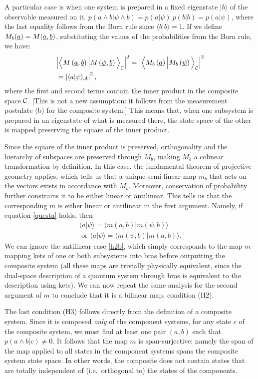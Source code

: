 \documentclass[aps,prl,amsmath,amssymb,twocolumn,nofootinbib]{revtex4}
\theoremstyle{plain}
\theoremstyle{definition}
\theoremstyle{remark}
\newcommand{\pj}[1] {\underbar{$#1$}}
\def\>{\rangle}
\def\<{\langle}
\def\labell#1{\label{#1}}
\begin{document}
A particular case is when one system is
prepared in a fixed eigenstate $|b\>$ of the observable measured on it,
$p(a\wedge b|\psi\wedge b)=p(a|\psi)\:p(b|b)=p(a|\psi)$, where the last equality follows from the Born rule since $\<b|b\>=1$. 
  If we define $M_b(\pj{a}) = M(\pj{a},\pj{b})$, substituting the values of the
probabilities from the Born rule, we have:
\begin{align} &\Big|\Big\<M\left(\pj{a},\pj{b}\right)\Big|M\left(\pj{\psi},\pj{b}\right)\Big\>_{\cal C}\Big|^2
  =\Big|\Big\<M_b\left(\pj{a}\right)\Big|M_b\left(\pj{\psi}\right)\Big\>_{\cal C}\Big|^2
\nonumber \\&
=\left|\<a|\psi\>_{\cal A}\right|^2
\labell{questa},
\end{align}
where the first and second terms contain the inner product in the composite
space $\cal C$. [This is not a new assumption: it follows from the
measurement postulate (b) for the composite system.] This means that,
when one subsystem is prepared in an eigenstate of what is measured
there, the state space of the other is mapped preserving the square of
the inner product.

Since the square of the inner product is preserved, orthogonality and
the hierarchy of subspaces are preserved through $M_b$, making $M_b$ a
colinear transformation by definition. In this case, the fundamental
theorem of projective geometry \cite{fun} applies, which tells us that
a unique semi-linear map $m_b$ that acts on the vectors exists in accordance with $M_b$.
Moreover, conservation of probability further constrains it to be
either linear or antilinear. This tells us that the corresponding $m$
is either linear or antilinear in the first argument. Namely, if equation
\eqref{questa} holds, then
\begin{align}
\<a|\psi\>=\<m(a,b)|m(\psi,b)\>\labell{h2}\;
 \\\mbox{ or }
\<a|\psi\>=\<m(\psi,b)|m(a,b)\> \labell{h2b}.
\end{align}
We can ignore the antilinear case \eqref{h2b}, which simply
corresponds to the map $m$ mapping kets of one or both subsystems into
bras before outputting the composite system (all these maps are
trivially physically equivalent, since the dual-space description of a
quantum system through bras is equivalent to the description using
kets). We can now repeat the same analysis for the second argument of
$m$ to conclude that it is a bilinear map, condition (H2).

The last condition (H3) follows directly from the definition of a
composite system. Since it is composed {\em only} of the component
systems, for any state $c$ of the composite system, we must find at least one pair $(a, b)$ such that $p(a\wedge b | c)\neq 0$. It follows that the map $m$ is span-surjective: namely the
span of the map applied to all states in the component systems spans
the composite system state space. In other words, the composite does
not contain states that are totally independent of (i.e.~orthogonal
to) the states of the components.
\end{document}
